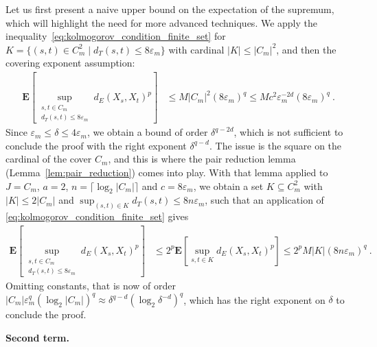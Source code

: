 \documentclass[lean]{Draft}
\begin{document}
Let us first present a naive upper bound on the expectation of the supremum, which will highlight the need for more advanced techniques.
We apply the inequality~\eqref{eq:kolmogorov_condition_finite_set} for $K = \{(s,t) \in C_m^2 \mid d_T(s, t) \le 8 \varepsilon_m\}$ with cardinal $\lvert K \rvert \le \lvert C_m \rvert^2$, and then the covering exponent assumption:
\begin{align*}
  \mathbf{E}\left[ \sup_{\substack{s, t \in C_m \\ d_T(s, t) \le 8 \varepsilon_m}} d_E(X_s, X_t)^p \right]
  &\le M \lvert C_m \rvert^2 (8 \varepsilon_m)^q
  \le M c^2 \varepsilon_m^{-2d} (8 \varepsilon_m)^q
  \: .
\end{align*}
Since $\varepsilon_m \le \delta \le 4 \varepsilon_m$, we obtain a bound of order $\delta^{q - 2d}$, which is not sufficient to conclude the proof with the right exponent $\delta^{q - d}$.
The issue is the square on the cardinal of the cover $C_m$, and this is where the pair reduction lemma (Lemma~\ref{lem:pair_reduction}) comes into play.
With that lemma applied to $J = C_m$, $a = 2$, $n = \lceil \log_2 \lvert C_m \rvert \rceil$ and $c = 8 \varepsilon_m$, we obtain a set $K \subseteq C_m^2$ with $\lvert K \rvert \le 2 \lvert C_m \rvert$ and $\sup_{(s, t) \in K} d_T(s, t) \le 8 n \varepsilon_m$, such that an application of \eqref{eq:kolmogorov_condition_finite_set} gives
\begin{align*}
  \mathbf{E}\left[ \sup_{\substack{s, t \in C_m \\ d_T(s, t) \le 8 \varepsilon_m}} d_E(X_s, X_t)^p \right]
  &\le 2^p \mathbf{E}\left[ \sup_{s, t \in K} d_E(X_s, X_t)^p \right]
  \le 2^p M \lvert K \rvert (8 n \varepsilon_m)^q
  \: .
\end{align*}
Omitting constants, that is now of order
$\lvert C_m \rvert \varepsilon_m^q (\log_2 \lvert C_m\rvert)^q \approx \delta^{q - d} \left(\log_2 \delta^{-d} \right)^q
$, which has the right exponent on $\delta$ to conclude the proof.

\textbf{Second term.}
\end{document}

